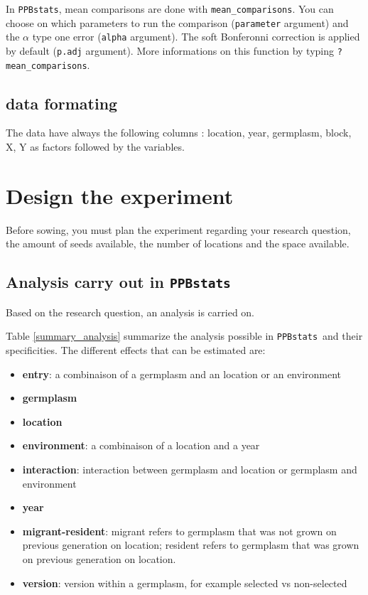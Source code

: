 \documentclass{book}\usepackage[]{graphicx}\usepackage[]{color}
\newcommand{\pack}{\texttt{PPBstats}}
\begin{document}
In \pack, mean comparisons are done with \texttt{mean\_comparisons}.
You can choose on which parameters to run the comparison (\texttt{parameter} argument) and the $\alpha$ type one error (\texttt{alpha} argument).
The soft Bonferonni correction is applied by default (\texttt{p.adj} argument).
More informations on this function by typing \texttt{?mean\_comparisons}.

\subsection{data formating}

The data have always the following columns : location, year, germplasm, block, X, Y as factors followed by the variables.

\newpage


\section{Design the experiment}
\label{doe}

Before sowing, you must plan the experiment regarding your research question, the amount of seeds available, the number of locations and the space available.

\subsection{Analysis carry out in \pack}

Based on the research question, an analysis is carried on.

Table \ref{summary_analysis} summarize the analysis possible in \pack~and their specificities.
The different effects that can be estimated are:
\begin{itemize}
\item \textbf{entry}: a combinaison of a germplasm and an location or an environment
\item \textbf{germplasm}
\item \textbf{location}
\item \textbf{environment}: a combinaison of a location and a year
\item \textbf{interaction}: interaction between germplasm and location or germplasm and environment
\item \textbf{year}
\item \textbf{migrant-resident}: migrant refers to germplasm that was not grown on previous generation on location; resident refers to germplasm that was grown  on previous generation on location.
\item \textbf{version}: version within a germplasm, for example selected vs non-selected
\end{itemize}
\end{document}
